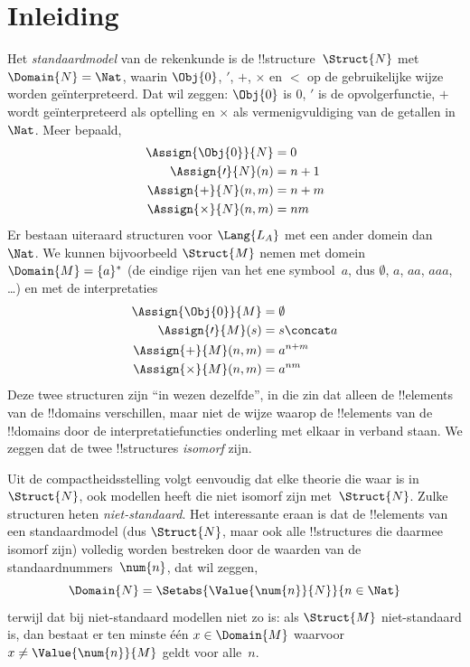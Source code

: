 \documentclass[../../../include/open-logic-section]{subfiles}
\begin{document}
\section{Inleiding}

Het \emph{standaardmodel} van de rekenkunde is de
!!{structure}~$\Struct{N}$ met $\Domain{N} = \Nat$, waarin
$\Obj{0}$, $\prime$, $+$, $\times$ en $<$ op de gebruikelijke wijze
worden geïnterpreteerd. Dat wil zeggen: $\Obj{0}$ is $0$, $\prime$ is de
opvolgerfunctie, $+$ wordt geïnterpreteerd als optelling en $\times$ als
vermenigvuldiging van de getallen in~$\Nat$. Meer bepaald,
\begin{align*}
  \Assign{\Obj{0}}{N} & = 0\\
  \Assign{\prime}{N}(n) & = n + 1\\
  \Assign{+}{N}(n, m) & = n + m\\
  \Assign{\times}{N}(n, m) & = nm
\end{align*}
Er bestaan uiteraard structuren voor $\Lang{L_A}$ met een ander domein
dan~$\Nat$. We kunnen bijvoorbeeld $\Struct{M}$ nemen met domein
$\Domain{M} = \{a\}^*$ (de eindige rijen van het ene
symbool~$a$, dus $\emptyset$, $a$, $aa$, $aaa$, \dots) en met de
interpretaties
\begin{align*}
  \Assign{\Obj{0}}{M} & = \emptyset\\
  \Assign{\prime}{M}(s) & = s \concat a\\
  \Assign{+}{M}(n, m) & = a^{n + m}\\
  \Assign{\times}{M}(n, m) & = a^{nm}
\end{align*}
Deze twee structuren zijn ``in wezen dezelfde'', in die zin dat alleen de
!!{element}s van de !!{domain}s verschillen, maar niet de wijze waarop de
!!{element}s van de !!{domain}s door de interpretatiefuncties onderling met
elkaar in verband staan. We zeggen dat de twee !!{structure}s
\emph{isomorf} zijn.

Uit de compactheidsstelling volgt eenvoudig dat elke theorie die waar is
in~$\Struct{N}$, ook modellen heeft die niet isomorf zijn
met~$\Struct{N}$. Zulke structuren heten \emph{niet-standaard}. Het
interessante eraan is dat de !!{element}s van een standaardmodel (dus
$\Struct{N}$, maar ook alle !!{structure}s die daarmee isomorf zijn)
volledig worden bestreken door de waarden van de
standaardnummers~$\num{n}$, dat wil zeggen,
\[
\Domain{N} = \Setabs{\Value{\num{n}}{N}}{n \in \Nat}
\]
terwijl dat bij niet-standaard modellen niet zo is: als $\Struct{M}$
niet-standaard is, dan bestaat er ten minste één $x \in \Domain{M}$ waarvoor
$x \neq \Value{\num{n}}{M}$ geldt voor alle~$n$.
\end{document}
